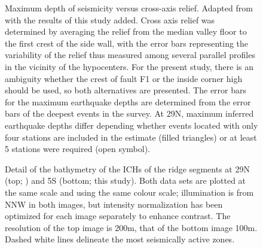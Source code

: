\documentclass[jgr]{agu2001}
\renewcommand{\includefig}[2]{}
\begin{document}
\begin{figure}
\includefig{maxdep-topo/maxdep-topo}{20pc} %

\caption{Maximum depth of seismicity versus cross-axis relief. Adapted from
  \protect\citet{barclay01} with the results of this study added. 
Cross axis relief was determined by averaging the relief from the median valley
floor to the first crest of the side wall, with the error bars representing the 
variability of the relief thus measured among several parallel profiles in the
vicinity of the hypocenters.  For the present study, there is an 
ambiguity whether the crest of fault F1 or the inside corner high should be used,
so both alternatives are presented.  The error bars for the maximum earthquake depths
are determined from the error bars of the deepest events in the
survey. At 29\dg N, maximum inferred earthquake depths differ
depending whether events located with only four stations are included
in the estimate (filled triangles) or at least 5 stations were
required (open symbol).}
\label{fig:maxdep-topo}
\end{figure}

\begin{figure}
\includefig{topo-cmp/topo-cmp}{20pc} %
\caption{Detail of the bathymetry of the ICHs of the ridge segments at
29\dg N (top; \citet{wolfe95}) and 5\dg S (bottom; this study).  Both
data sets are plotted at the same scale and using the same colour
scale; illumination is from NNW in both images, but intensity
normalization  has been optimized for each image separately to enhance contrast.  The resolution of the top image is 200m, that of
the bottom image 100m. 
Dashed white
lines delineate the most seismically active zones.}
\label{fig:topo-cmp}
\end{figure}


\setcounter{figure}{0}
\renewcommand{\thefigure}{A\arabic{figure}}

\setcounter{table}{0}
\renewcommand{\thetable}{A\arabic{table}}


\clearpage


\begin{table}
\label{tbl:stations}
\end{table}


\clearpage
\end{document}
